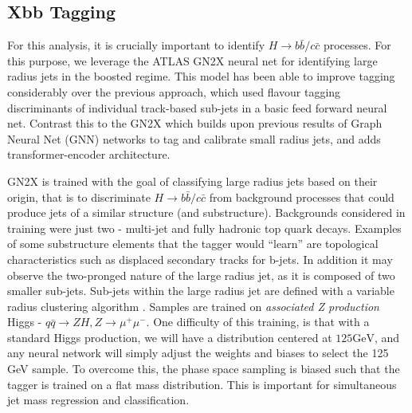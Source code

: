 \documentclass[12pt]{article}
\begin{document}
\subsection{Xbb Tagging}
For this analysis, it is crucially important to identify $H\rightarrow b\bar{b}
/ c\bar{c}$ processes. For this purpose, we leverage the ATLAS GN2X neural net
for identifying large radius jets in the boosted regime. This model has been
able to improve tagging considerably over the previous approach, which used
flavour tagging discriminants of individual track-based sub-jets in a basic feed
forward neural net. Contrast this to the GN2X which builds upon previous results
of Graph Neural Net (GNN) networks to tag and calibrate small radius jets, and
adds transformer-encoder architecture.


GN2X is trained with the goal of classifying large radius jets based on their
origin, that is to discriminate $H\rightarrow b\bar{b}/c\bar{c}$ from background
processes that could produce jets of a similar structure (and substructure).
Backgrounds considered in training were just two - multi-jet and fully hadronic
top quark decays. Examples of some substructure elements that the tagger would
``learn'' are topological characteristics such as displaced secondary tracks for
b-jets. In addition it may observe the two-pronged nature of the large radius
jet, as it is composed of two smaller sub-jets. Sub-jets within the large radius
jet are defined with a variable radius clustering algorithm
\cite{jet_substructure}. Samples are trained on \textit{associated Z production}
Higgs - $q\bar{q}\rightarrow ZH, Z\rightarrow \mu^+\mu^-$. One difficulty of
this training, is that with a standard Higgs production, we will have a
distribution centered at $125 \text{GeV}$, and any neural network will simply
adjust the weights and biases to select the 125 GeV sample. To overcome this,
the phase space sampling is biased such that the tagger is trained on a flat
mass distribution. This is important for simultaneous jet mass regression and
classification.
\end{document}
